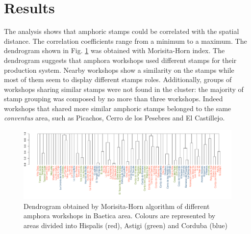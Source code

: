 \documentclass[review]{elsarticle}
\newcommand{\memo}[2]{\textcolor{#1}{#2}}
\newcommand{\xavi}[1]{\memo{magenta}{XRC: #1\\}}
\begin{document}

\section{Results}

The analysis shows that amphoric stamps could be correlated with the spatial distance. The correlation coefficients range from a minimum to a maximum. The dendrogram shown in Fig. \ref{dendro} was obtained with Morisita-Horn index. The dendrogram suggests that amphora workshops used different stamps for their production system. Nearby workshops show a similarity on the stamps while most of them seem to display different stamps roles. Additionally, groups of workshops sharing similar stamps were not found in the cluster: the majority of stamp grouping was composed by no more than three workshops. Indeed workshops that shared more similar amphoric stamps belonged to the same \textit{conventus} area, such as Picachos, Cerro de los Pesebres and El Castillejo. 

\begin{figure}[htp]
	\centering
\includegraphics[width=\linewidth]{figs/dendro}
\caption{Dendrogram obtained by Morisita-Horn algorithm of different amphora workshops in Baetica area. Colours are represented by areas divided into Hispalis (red), Astigi (green) and Corduba (blue)}
\label{dendro}
\end{figure} 



\end{document}
